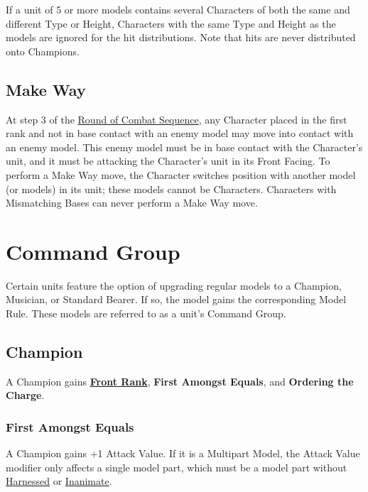 If a unit of 5 or more \rnf{} models contains several Characters of both the same and different Type or Height, Characters with the same Type and Height as the \rnf{} models are ignored for the hit distributions. Note that hits are never distributed onto Champions.

\subsection{Make Way}
\label{make_way}

At step 3 of the \hyperref[round_of_combat_sequence]{Round of Combat Sequence}, any Character placed in the first rank and not in base contact with an enemy model may move into contact with an enemy model. This enemy model must be in base contact with the Character's unit, and it must be attacking the Character's unit in its Front Facing. To perform a Make Way move, the Character switches position with another model (or models) in its unit; these models cannot be Characters. Characters with Mismatching Bases can never perform a Make Way move.

\section{Command Group}
\label{command_group}

Certain units feature the option of upgrading regular models to a Champion, Musician, or Standard Bearer. If so, the model gains the corresponding Model Rule. These models are referred to as a unit's Command Group.

\subsection{Champion}
\label{champion}

A Champion gains \hyperref[front_rank]{\textbf{Front Rank}}, \textbf{First Amongst Equals}, and \textbf{Ordering the Charge}.

\subsubsection{First Amongst Equals}
\label{first_among_equals}

A Champion gains +1 Attack Value. If it is a Multipart Model, the Attack Value modifier only affects a single model part, which must be a model part without \hyperref[harnessed]{Harnessed} or \hyperref[inanimate]{Inanimate}.

